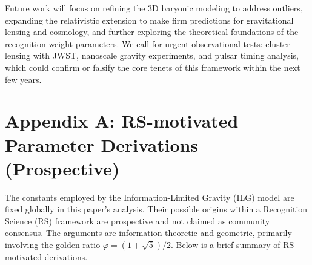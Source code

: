 \documentclass[fleqn,usenatbib]{mnras}
\begin{document}
Future work will focus on refining the 3D baryonic modeling to address outliers, expanding the relativistic extension to make firm predictions for gravitational lensing and cosmology, and further exploring the theoretical foundations of the recognition weight parameters. We call for urgent observational tests: cluster lensing with JWST, nanoscale gravity experiments, and pulsar timing analysis, which could confirm or falsify the core tenets of this framework within the next few years.

\medskip
\noindent{}

\appendix
\section*{Appendix A: RS-motivated Parameter Derivations (Prospective)}

The constants employed by the Information-Limited Gravity (ILG) model are fixed globally in this paper's analysis. Their possible origins within a Recognition Science (RS) framework are prospective and not claimed as community consensus. The arguments are information-theoretic and geometric, primarily involving the golden ratio $\varphi = (1+\sqrt{5})/2$. Below is a brief summary of RS-motivated derivations.
\end{document}
